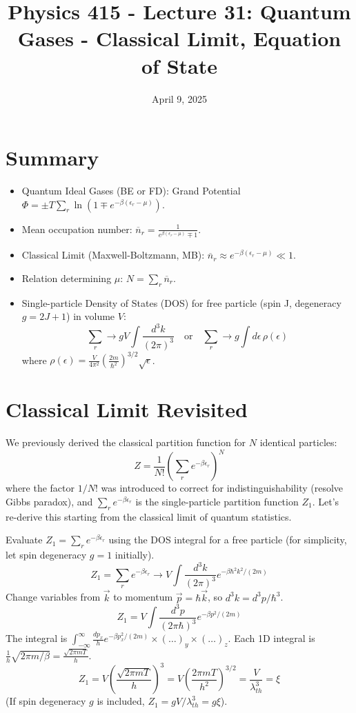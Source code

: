 \documentclass[11pt]{article}
\title{Physics 415 - Lecture 31: Quantum Gases - Classical Limit, Equation of State}
\date{April 9, 2025}
\author{} %
\newcommand{\lambdaT}{\lambda_{th}} %
\newcommand{\eps}{\epsilon}
\newcommand{\nbar}{\overline{n}} %
\begin{document}
\maketitle
\thispagestyle{empty}

\section*{Summary}

\begin{itemize}
    \item Quantum Ideal Gases (BE or FD): Grand Potential $\Phi = \pm T \sum_r \ln(1 \mp e^{-\beta(\eps_r-\mu)})$.
    \item Mean occupation number: $\nbar_r = \frac{1}{e^{\beta(\eps_r-\mu)} \mp 1}$.
    \item Classical Limit (Maxwell-Boltzmann, MB): $\nbar_r \approx e^{-\beta(\eps_r-\mu)} \ll 1$.
    \item Relation determining $\mu$: $N = \sum_r \nbar_r$.
    \item Single-particle Density of States (DOS) for free particle (spin J, degeneracy $g=2J+1$) in volume $V$:
        \[ \sum_r \to g V \int \frac{d^3k}{(2\pi)^3} \quad \text{or} \quad \sum_r \to g \int d\eps \, \rho(\eps) \]
        where $\rho(\eps) = \frac{V}{4\pi^2} \left( \frac{2m}{\hbar^2} \right)^{3/2} \sqrt{\eps}$.
\end{itemize}

\section*{Classical Limit Revisited}

We previously derived the classical partition function for $N$ identical particles:
\[ Z = \frac{1}{N!} \left( \sum_r e^{-\beta\eps_r} \right)^N \]
where the factor $1/N!$ was introduced to correct for indistinguishability (resolve Gibbs paradox), and $\sum_r e^{-\beta\eps_r}$ is the single-particle partition function $Z_1$. Let's re-derive this starting from the classical limit of quantum statistics.

Evaluate $Z_1 = \sum_r e^{-\beta\eps_r}$ using the DOS integral for a free particle (for simplicity, let spin degeneracy $g=1$ initially).
\[ Z_1 = \sum_r e^{-\beta\eps_r} \to V \int \frac{d^3k}{(2\pi)^3} e^{-\beta \hbar^2 k^2 / (2m)} \]
Change variables from $\vec{k}$ to momentum $\vec{p} = \hbar\vec{k}$, so $d^3k = d^3p / \hbar^3$.
\[ Z_1 = V \int \frac{d^3p}{(2\pi\hbar)^3} e^{-\beta p^2 / (2m)} \]
The integral is $\int_{-\infty}^\infty \frac{dp_x}{h} e^{-\beta p_x^2/(2m)} \times (\dots)_y \times (\dots)_z$.
Each 1D integral is $\frac{1}{h} \sqrt{2\pi m / \beta} = \frac{\sqrt{2\pi m T}}{h}$.
\[ Z_1 = V \left( \frac{\sqrt{2\pi m T}}{h} \right)^3 = V \left( \frac{2\pi m T}{h^2} \right)^{3/2} = \frac{V}{\lambdaT^3} = \xi \]
(If spin degeneracy $g$ is included, $Z_1 = g V / \lambdaT^3 = g\xi$).
\end{document}

